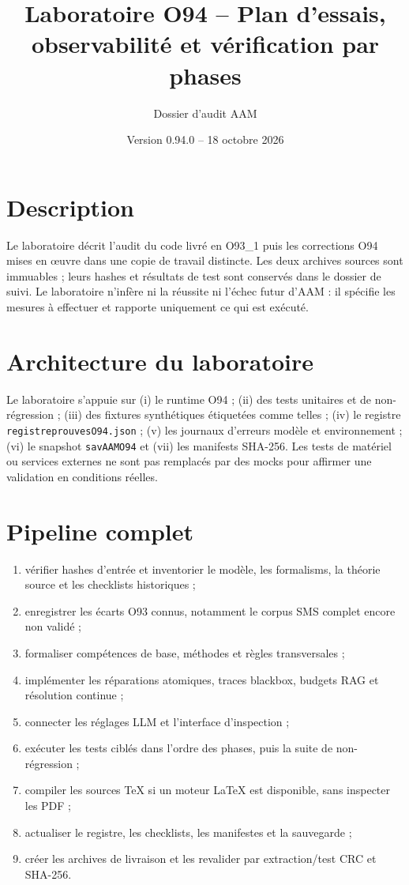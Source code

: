 \documentclass[11pt,a4paper]{article}
\title{Laboratoire O94 -- Plan d'essais, observabilité et vérification par phases}
\author{Dossier d'audit AAM}
\date{Version 0.94.0 -- 18 octobre 2026}
\begin{document}
\maketitle
\tableofcontents
\section{Description}
Le laboratoire décrit l'audit du code livré en O93_1 puis les corrections O94 mises en œuvre dans une copie de travail distincte. Les deux archives sources sont immuables ; leurs hashes et résultats de test sont conservés dans le dossier de suivi. Le laboratoire n'infère ni la réussite ni l'échec futur d'AAM : il spécifie les mesures à effectuer et rapporte uniquement ce qui est exécuté.

\section{Architecture du laboratoire}
Le laboratoire s'appuie sur (i) le runtime O94 ; (ii) des tests unitaires et de non-régression ; (iii) des fixtures synthétiques étiquetées comme telles ; (iv) le registre \texttt{registre\textunderscore prouves\textunderscore O94.json} ; (v) les journaux d'erreurs modèle et environnement ; (vi) le snapshot \texttt{sav\textunderscore AAM\textunderscore O94} et (vii) les manifests SHA-256. Les tests de matériel ou services externes ne sont pas remplacés par des mocks pour affirmer une validation en conditions réelles.

\section{Pipeline complet}
\begin{enumerate}
\item vérifier hashes d'entrée et inventorier le modèle, les formalisms, la théorie source et les checklists historiques ;
\item enregistrer les écarts O93 connus, notamment le corpus SMS complet encore non validé ;
\item formaliser compétences de base, méthodes et règles transversales ;
\item implémenter les réparations atomiques, traces blackbox, budgets RAG et résolution continue ;
\item connecter les réglages LLM et l'interface d'inspection ;
\item exécuter les tests ciblés dans l'ordre des phases, puis la suite de non-régression ;
\item compiler les sources TeX si un moteur LaTeX est disponible, sans inspecter les PDF ;
\item actualiser le registre, les checklists, les manifestes et la sauvegarde ;
\item créer les archives de livraison et les revalider par extraction/test CRC et SHA-256.
\end{enumerate}
\end{document}
